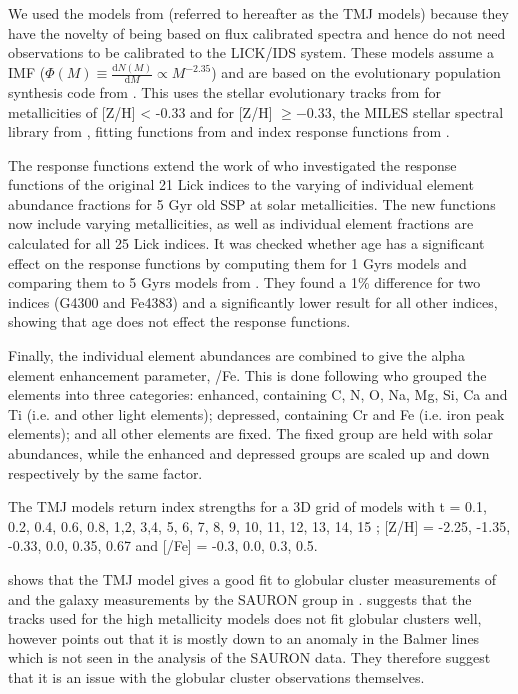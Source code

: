 		We used the models from \citet{Thomas2010} (referred to hereafter as the TMJ models) because they have the novelty of being based on flux calibrated spectra and hence do not need observations to be calibrated to the LICK/IDS system. These models assume a \citet{Salpeter1955} IMF ($\Phi(M) \equiv \frac{\mathrm{d}N(M)}{\mathrm{d}M} \propto M^{-2.35}$) and are based on the evolutionary population synthesis code from \citet{Maraston1998}. This uses the stellar evolutionary tracks from \citet{Cassisi1997} for metallicities of [Z/H] < -0.33 and \citet{Girardi2000} for [Z/H] $\ge -0.33$, the MILES stellar spectral library from \citet{Sanchez-Blazquez2006a, Falcon-Barroso2011a}, fitting functions from \citet{Johansson2010} and index response functions from \citet{Korn2005}.

		The \citet{Korn2005} response functions extend the work of \citet{Tripicco1995} who investigated the response functions of the original 21 Lick indices to the varying of individual element abundance fractions for 5 Gyr old SSP at solar metallicities. The new functions now include varying metallicities, as well as individual element fractions are calculated for all 25 Lick indices. It was checked whether age has a significant effect on the response functions by computing them for 1 Gyrs models and comparing them to 5 Gyrs models from \citet{Tripicco1995}. They found a 1\% difference for two indices (G4300 and Fe4383) and a significantly lower result for all other indices, showing that age does not effect the response functions.

		Finally, the individual element abundances are combined to give the alpha element enhancement parameter, \textalpha/Fe. This is done following \citet{Trager2000} who grouped the elements into three categories: enhanced, containing C, N, O, Na, Mg, Si, Ca and Ti (i.e. \textalpha and other light elements); depressed, containing Cr and Fe (i.e. iron peak elements); and all other elements are fixed. The fixed group are held with solar abundances, while the enhanced and depressed groups are scaled up and down respectively by the same factor. 

		The TMJ models return index strengths for a 3D grid of models with t = 0.1, 0.2, 0.4, 0.6, 0.8, 1,2, 3,4, 5, 6, 7, 8, 9, 10, 11, 12, 13, 14, 15 ; [Z/H] = -2.25, -1.35, -0.33, 0.0, 0.35, 0.67 and [\alpha/Fe] = -0.3, 0.0, 0.3, 0.5.  

		\citet{Thomas2010} shows that the TMJ model gives a good fit to globular cluster measurements of \citet{Puzia2002, Schiavon2005} and the galaxy measurements by the SAURON group in \citet{Kuntschner2010}. \citet{Conroy2010} suggests that the \citet{Girardi2000} tracks used for the high metallicity models does not fit globular clusters well, however \citet{Thomas2010} points out that it is mostly down to an anomaly in the Balmer lines which is not seen in the analysis of the SAURON data. They therefore suggest that it is an issue with the globular cluster observations themselves. 


